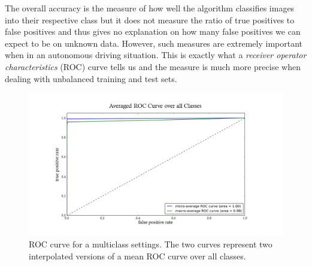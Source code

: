 \documentclass[11pt,a4paper]{article}
\begin{document}
The overall accuracy is the measure of how well the algorithm classifies images into their respective class but it does not measure the ratio of true positives to false positives and thus gives no explanation on how many false positives we can expect to be on unknown data. However, such measures are extremely important when in an autonomous driving situation. This is exactly what a \textit{receiver operator characteristics} (ROC) curve tells us and the measure is much more precise when dealing with unbalanced training and test sets.
\begin{figure}[h!]
	\includegraphics[width=\textwidth]{roc_multi.png}
	\centering
	\caption[Average ROC Curve]{ROC curve for a multiclass settings. The two curves represent two interpolated versions of a mean ROC curve over all classes.}
	\label{fig:roc_avg}
\end{figure}
\end{document}
